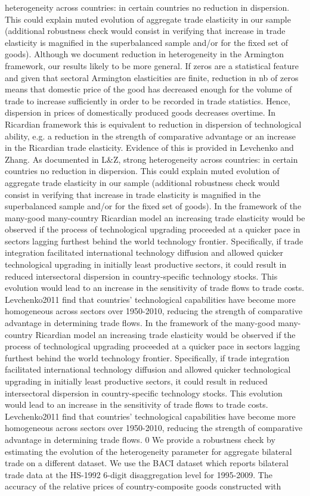 \documentclass[12pt,twoside,a4paper,notitlepage]{article}
\begin{document}
heterogeneity across countries: in certain countries no reduction in dispersion. This could explain muted evolution of aggregate trade elasticity in our sample (additional robustness check would consist in verifying that increase in trade elasticity is magnified in the superbalanced sample and/or for the fixed set of goods). Although we document reduction in heterogeneity in the Armington framework, our results likely to be more general. If zeros are a statistical feature and given that sectoral Armington elasticities are finite, reduction in nb of zeros means that domestic price of the good has decreased enough for the volume of trade to increase sufficiently in order to be recorded in trade statistics. Hence, dispersion in prices of domestically produced goods decreases overtime. In Ricardian framework this is equivalent to reduction in dispersion of technological ability, e.g. a reduction in the strength of comparative advantage or an increase in the Ricardian trade elasticity. Evidence of this is provided in Levchenko and Zhang. As documented in L\&Z, strong heterogeneity across countries: in certain countries no reduction in dispersion. This could explain muted evolution of aggregate trade elasticity in our sample (additional robustness check would consist in verifying that increase in trade elasticity is magnified in the superbalanced sample and/or for the fixed set of goods). In the framework of the many-good many-country Ricardian model an increasing trade elasticity would be observed if the process of technological upgrading proceeded at a quicker pace in sectors lagging furthest behind the world technology frontier. Specifically, if trade integration facilitated international technology diffusion and allowed quicker technological upgrading in initially least productive sectors, it could result in reduced intersectoral dispersion in country-specific technology stocks. This evolution would lead to an increase in the sensitivity of trade flows to trade costs. Levchenko2011 find that countries' technological capabilities have become more homogeneous across sectors over 1950-2010, reducing the strength of comparative advantage in determining trade flows. In the framework of the many-good many-country Ricardian model an increasing trade elasticity would be observed if the process of technological upgrading proceeded at a quicker pace in sectors lagging furthest behind the world technology frontier. Specifically, if trade integration facilitated international technology diffusion and allowed quicker technological upgrading in initially least productive sectors, it could result in reduced intersectoral dispersion in country-specific technology stocks. This evolution would lead to an increase in the sensitivity of trade flows to trade costs. Levchenko2011 find that countries' technological capabilities have become more homogeneous across sectors over 1950-2010, reducing the strength of comparative advantage in determining trade flows. 0 We provide a robustness check by estimating the evolution of the heterogeneity parameter for aggregate bilateral trade on a different dataset. We use the BACI dataset which reports bilateral trade data at the HS-1992 6-digit disaggregation level for 1995-2009. The accuracy of the relative prices of country-composite goods constructed with 
\end{document}
